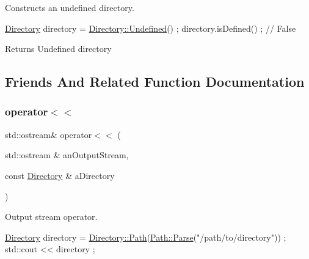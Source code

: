 Constructs an undefined directory. 


\begin{DoxyCode}
\hyperlink{classlibrary_1_1core_1_1fs_1_1Directory_a3ec39f6cad19a81d520e9a1f2d8bb1f7}{Directory} directory = \hyperlink{classlibrary_1_1core_1_1fs_1_1Directory_ae26fce16c37e5fed2bcc4d914a5eaa71}{Directory::Undefined}() ;
directory.isDefined() ; \textcolor{comment}{// False}
\end{DoxyCode}


\begin{DoxyReturn}{Returns}
Undefined directory 
\end{DoxyReturn}


\subsection{Friends And Related Function Documentation}
\mbox{\label{classlibrary_1_1core_1_1fs_1_1Directory_a3cbfede39f82ab145f110ca14e21deef}} 
\subsubsection{\texorpdfstring{operator$<$$<$}{operator<<}}
{\footnotesize\ttfamily std\+::ostream\& operator$<$$<$ (\begin{DoxyParamCaption}\item[{std\+::ostream \&}]{an\+Output\+Stream,  }\item[{const \hyperlink{classlibrary_1_1core_1_1fs_1_1Directory}{Directory} \&}]{a\+Directory }\end{DoxyParamCaption})\hspace{0.3cm}{\ttfamily [friend]}}



Output stream operator. 


\begin{DoxyCode}
\hyperlink{classlibrary_1_1core_1_1fs_1_1Directory_a3ec39f6cad19a81d520e9a1f2d8bb1f7}{Directory} directory = \hyperlink{classlibrary_1_1core_1_1fs_1_1Directory_a6d3ea04654841e62a4dbd99feb563caf}{Directory::Path}(\hyperlink{classlibrary_1_1core_1_1fs_1_1Path_aebf5bd3af83e0b7376616e146f3e55df}{Path::Parse}(\textcolor{stringliteral}{"/path/to/directory"}))
       ;
std::cout << directory ;
\end{DoxyCode}



